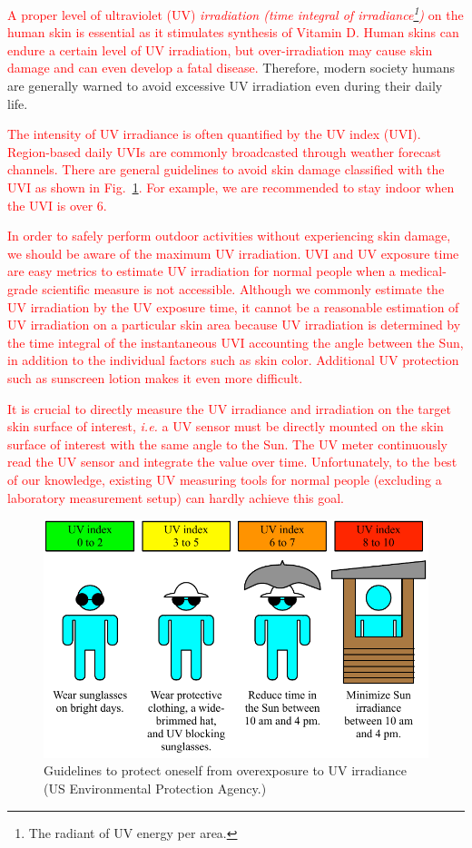 \documentclass[journal]{IEEEtran}
\begin{document}
\textcolor{red}{A proper level of ultraviolet (UV) \textit{irradiation (time integral of irradiance\footnote{The radiant of UV energy per area.})} on the human skin is essential as it stimulates synthesis of Vitamin D. Human skins can endure a certain level of UV irradiation, but over-irradiation may cause skin damage and can even develop a fatal disease.}
Therefore, modern society humans are generally warned to avoid excessive UV irradiation even during their daily life.

\textcolor{red}{The intensity of UV irradiance is often quantified by the UV index (UVI). Region-based daily UVIs are commonly broadcasted through weather forecast channels. There are general guidelines to avoid skin damage classified with the UVI as shown in Fig.~\ref{fig:guidelines}. For example, we are recommended to stay indoor when the UVI  is over 6.} 

\textcolor{red}{In order to safely perform outdoor activities without experiencing skin damage, we should be aware of  the maximum UV irradiation. UVI and UV exposure time are easy metrics to estimate UV irradiation for normal people when a medical-grade scientific measure is not accessible. Although we commonly estimate the UV irradiation by the UV exposure time, it cannot be a reasonable estimation of UV irradiation on a particular skin area because UV irradiation is determined by the time integral of the instantaneous UVI accounting the angle between the Sun, in addition to the individual factors such as skin color. Additional UV protection such as sunscreen lotion makes it even more difficult.} 

\textcolor{red}{It is crucial to directly measure the UV irradiance and irradiation on the target skin surface of interest, \textit{i.e.} a UV sensor must be directly mounted on the skin surface of interest with the same angle to the Sun. The UV meter continuously read the UV sensor and integrate the value over time. Unfortunately, to the best of our knowledge, existing UV measuring tools for normal people (excluding a laboratory measurement setup) can hardly achieve this goal.}

\begin{figure}
\centering
\includegraphics[width=1.0\hsize]{Figures/UVI_guideline.pdf}
\caption{Guidelines to protect oneself from overexposure to UV irradiance (US Environmental Protection Agency.)}
\label{fig:guidelines}
\vskip -10pt
\end{figure}
\end{document}
